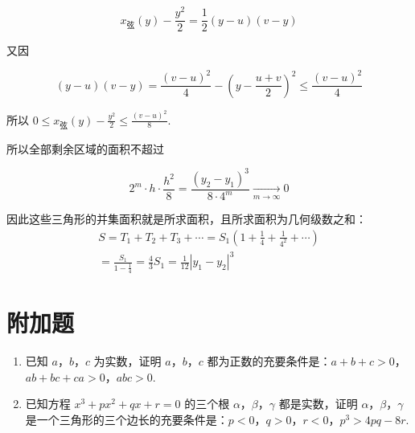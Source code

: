 \documentclass[UTF8,a4paper,oneside,11pt]{ctexbook}
\begin{document}
\begin{solution}
\begin{enumerate}
\[
x_{\text{弦}}(y)-\frac{y^2}{2}=\frac12(y-u)(v-y)
\]

又因

\[
(y-u)(v-y)=\frac{(v-u)^2}{4}-\left(y-\frac{u+v}{2}\right)^2\leq\frac{(v-u)^2}{4}
\]

所以 \(0\leq x_{\text{弦}}(y)-\frac{y^2}{2}\leq\frac{(v-u)^2}{8}\).

所以全部剩余区域的面积不超过

\[
2^m\cdot h\cdot\frac{h^2}{8}=\frac{(y_2-y_1)^3}{8\cdot4^m}\xrightarrow[m\to\infty]{}0
\]

因此这些三角形的并集面积就是所求面积，且所求面积为几何级数之和：
\[
\begin{gathered}
S=T_1+T_2+T_3+\cdots=S_1\left(1+\frac14+\frac1{4^2}+\cdots\right)\\
=\frac{S_1}{1-\frac14}=\frac43S_1=\frac1{12}|y_1-y_2|^3
\end{gathered}
\]
\end{enumerate}
\end{solution}

\section{附加题}

\begin{problem}
\begin{enumerate}
\item 已知 \(a\)，\(b\)，\(c\) 为实数，证明 \(a\)，\(b\)，\(c\) 都为正数的充要条件是：\(a+b+c>0\)，\(ab+bc+ca>0\)，\(abc>0\).
\item 已知方程 \(x^3+px^2+qx+r=0\) 的三个根 \(\alpha\)，\(\beta\)，\(\gamma\) 都是实数，证明 \(\alpha\)，\(\beta\)，\(\gamma\) 是一个三角形的三个边长的充要条件是：\(p<0\)，\(q>0\)，\(r<0\)，\(p^3>4pq-8r\).
\end{enumerate}
\end{problem}
\end{document}
